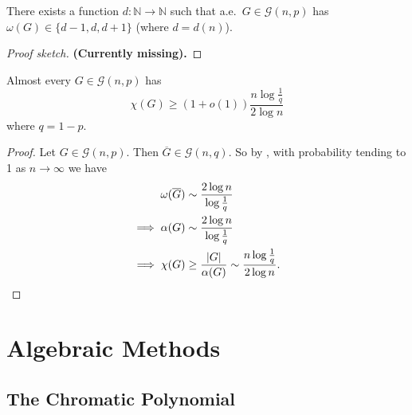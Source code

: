 \documentclass{article}
\begin{document}
\begin{nthm}\label{thm:41}
    There exists a function $d: \mathbb{N} \to \mathbb{N}$ such that a.e.\ $G \in \mathcal{G}(n,p)$ has $\omega(G) \in \{d-1,d,d+1\}$ (where $d = d(n)$).
\end{nthm}
\begin{proof}[Proof sketch]
    \textbf{(Currently missing).}
\end{proof}

\begin{ncor}\label{cor:42}
    Almost every $G \in \mathcal{G}(n,p)$ has
    \begin{equation*}
        \chi(G) \geq (1 + o(1))\frac{n \log \frac{1}{q}}{2 \log n}
    \end{equation*}
    where $q = 1-p.$
\end{ncor}
\begin{proof}
    Let $G \in \mathcal{G}(n,p)$. Then $\overline{G} \in \mathcal{G}(n,q)$.
    So by , with probability tending to 1 as $n \to \infty$ we have
    \begin{align*}
        \omega(\overline{G}) &\sim \frac{2 \log n}{\log \frac{1}{q}} \\
        \implies \alpha(G) &\sim \frac{2 \log n}{\log \frac{1}{q}}\\
        \implies \chi(G) &\geq \frac{|G|}{\alpha(G)} \sim \frac{n \log \frac{1}{q}}{2 \log n}. \qedhere
    \end{align*}
\end{proof}



\clearpage
\section{Algebraic Methods}



























\subsection{The Chromatic Polynomial}
\end{document}
